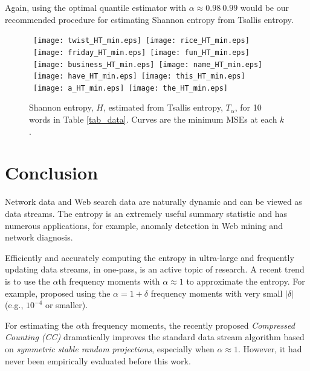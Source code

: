 \documentclass{sig-alternate}
\begin{document}
Again, using the optimal quantile estimator with $\alpha\approx 0.98 ~ 0.99$ would be our recommended procedure for estimating Shannon entropy from Tsallis entropy.


\begin{figure}[h]
\begin{center}\mbox{
{\texttt{[image: twist\_HT\_min.eps]}} \hspace{-0.1in}
{\texttt{[image: rice\_HT\_min.eps]}}}
\mbox{
{\texttt{[image: friday\_HT\_min.eps]}} \hspace{-0.1in}
{\texttt{[image: fun\_HT\_min.eps]}}
}\\
\mbox{
{\texttt{[image: business\_HT\_min.eps]}} \hspace{-0.1in}
{\texttt{[image: name\_HT\_min.eps]}}}
\mbox{
{\texttt{[image: have\_HT\_min.eps]}} \hspace{-0.1in}
{\texttt{[image: this\_HT\_min.eps]}}
}
\mbox{
{\texttt{[image: a\_HT\_min.eps]}} \hspace{-0.1in}
{\texttt{[image: the\_HT\_min.eps]}}
}
\end{center}
\vspace{-0.15in}
\caption{Shannon entropy, $H$, estimated from Tsallis entropy, $T_\alpha$, for 10 words in Table \ref{tab_data}. Curves are the minimum MSEs at each $k$. }\label{fig_HT_min}
\end{figure}
\clearpage
\section{Conclusion}\label{sec_conclusion}

Network data and Web search data are naturally dynamic and can be viewed as data streams. The entropy is an extremely useful summary statistic and has numerous applications, for example, anomaly detection in Web mining and network diagnosis.

Efficiently and accurately computing the entropy in ultra-large and frequently updating data streams, in one-pass, is an active topic of research. A recent trend is to use the $\alpha$th frequency moments with $\alpha\approx 1$ to approximate the entropy. For example, \cite{Article:Harvey_entropy_arXiv08,Proc:Harvey_FOCS08} proposed using the $\alpha = 1+\delta$ frequency moments with very small $|\delta|$ (e.g., $10^{-4}$ or smaller).

For estimating the $\alpha$th frequency moments, the recently proposed {\em Compressed Counting (CC)} dramatically improves the standard data stream algorithm based on {\em symmetric stable random projections}, especially when $\alpha\approx 1$. However, it had never been empirically evaluated before this work.
\end{document}
